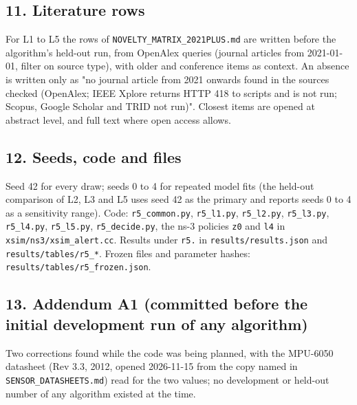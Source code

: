\subsection*{11. Literature rows}

For L1 to L5 the rows of \texttt{NOVELTY\_MATRIX\_2021PLUS.md} are written before the algorithm's held-out run, from OpenAlex queries (journal articles from 2021-01-01, filter on source type), with older and conference items as context. An absence is written only as "no journal article from 2021 onwards found in the sources checked (OpenAlex; IEEE Xplore returns HTTP 418 to scripts and is not run; Scopus, Google Scholar and TRID not run)". Closest items are opened at abstract level, and full text where open access allows.

\subsection*{12. Seeds, code and files}

Seed 42 for every draw; seeds 0 to 4 for repeated model fits (the held-out comparison of L2, L3 and L5 uses seed 42 as the primary and reports seeds 0 to 4 as a sensitivity range). Code: \texttt{r5\_common.py}, \texttt{r5\_l1.py}, \texttt{r5\_l2.py}, \texttt{r5\_l3.py}, \texttt{r5\_l4.py}, \texttt{r5\_l5.py}, \texttt{r5\_decide.py}, the ns-3 policies \texttt{z0} and \texttt{l4} in \texttt{xsim/ns3/xsim\_alert.cc}. Results under \texttt{r5.} in \texttt{results/results.json} and \texttt{results/tables/r5\_*}. Frozen files and parameter hashes: \texttt{results/tables/r5\_frozen.json}.

\subsection*{13. Addendum A1 (committed before the initial development run of any algorithm)}

Two corrections found while the code was being planned, with the MPU-6050 datasheet (Rev 3.3, 2012, opened 2026-11-15 from the copy named in \texttt{SENSOR\_DATASHEETS.md}) read for the two values; no development or held-out number of any algorithm existed at the time.

